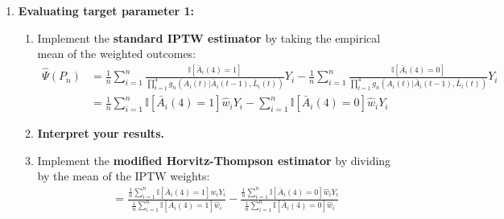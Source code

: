 \documentclass{exam}
\begin{document}
\begin{enumerate}
\begin{enumerate}
\begin{enumerate}
\[\]
Look at the distribution of the weights by using the \texttt{hist()} and \texttt{summary()} functions. \textbf{Comment on the distribution of the weights.}
\item Create a logical variable that indicates which students had a treatment history $\bar{a}(4) = 1$. For example:
\begin{Schunk}
\begin{Sinput}
> I1111 = ObsData2$A1 == 1 & ObsData2$A2 == 1 & ObsData2$A3 == 1 & ObsData2$A4 == 1
\end{Sinput}
\end{Schunk}
Repeat for students who had treatment history $\bar{a}(4) = 0$.
\item Look at the distribution of the weights for students who had $\bar{a}(4) = 1$, and then $\bar{a}(4) = 0$. \textbf{Comment on the distributions. In particular, what does the distribution of the weights tell you here that the time-point specific conditional probabilities of treatment do not?}
\end{enumerate}
\item \textbf{Evaluating target parameter 1:}
\begin{enumerate}
\item Implement the \textbf{standard IPTW estimator} by taking the empirical mean of the weighted outcomes:
\begin{align*}
\hat{\Psi}(P_n) & =\frac{1}{n}\sum_{i=1}^n\frac{\mathbb{I}[\bar{A}_i(4)=1]}{\prod_{t=1}^4g_n(A_i(t)|\bar{A}_i(t-1), \bar{L}_i(t))}Y_i - \frac{1}{n}\sum_{i=1}^n\frac{\mathbb{I}[\bar{A}_i(4)=0]}{\prod_{t=1}^4g_n(A_i(t)|\bar{A}_i(t-1), \bar{L}_i(t))}Y_i \\
& =\frac{1}{n}\sum_{i=1}^n\mathbb{I}[\bar{A}_i(4)=1]\hat{w}_iY_i - \sum_{i=1}^n\mathbb{I}[\bar{A}_i(4)=0]\hat{w}_iY_i
\end{align*}
\item \textbf{Interpret your results.}
\item Implement the \textbf{modified Horvitz-Thompson estimator} by dividing by the mean of the IPTW weights:
\begin{align*}
& = \frac{\frac{1}{n}\sum_{i=1}^n\mathbb{I}[\bar{A}_i(4)=1]\hat{w}_iY_i}{\frac{1}{n}\sum_{i=1}^n\mathbb{I}[\bar{A}_i(4)=1]\hat{w}_i} - \frac{\frac{1}{n}\sum_{i=1}^n\mathbb{I}[\bar{A}_i(4)=0]\hat{w}_iY_i}{\frac{1}{n}\sum_{i=1}^n\mathbb{I}[\bar{A}_i(4)=0]\hat{w}_i}
\end{align*}


\end{enumerate}
\end{enumerate}
\end{enumerate}
\end{document}

